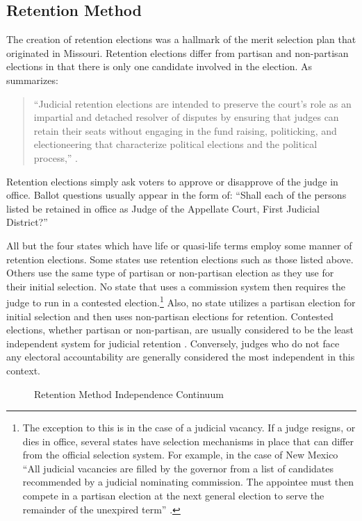 \documentclass[12pt]{article}
\begin{document}
\subsection*{Retention Method}
The creation of retention elections was a hallmark of the merit selection plan that originated in Missouri. Retention elections differ from partisan and non-partisan elections in that there is only one candidate involved in the election. As \citeauthor{Reid1999} summarizes: \begin{quote}``Judicial retention elections are intended to preserve the court’s role as an impartial and detached resolver of disputes by ensuring that judges can retain their seats without engaging in the fund raising, politicking, and electioneering that characterize political elections and the political process,'' \citep[68]{Reid1999}.\end{quote}  Retention elections simply ask voters to approve or disapprove of the judge in office. Ballot questions usually appear in the form of: ``Shall each of the persons listed be retained in office as Judge of the Appellate Court, First Judicial District?''

All but the four states which have life or quasi-life terms employ some manner of retention elections. Some states use retention elections such as those listed above. Others use the same type of partisan or non-partisan election as they use for their initial selection. No state that uses a commission system then requires the judge to run in a contested election.\footnote{The exception to this is in the case of a judicial vacancy.  If a judge resigns, or dies in office, several states have selection mechanisms in place that can differ from the official selection system.  For example, in the case of New Mexico ``All judicial vacancies are filled by the governor from a list of candidates recommended by a judicial nominating commission. The appointee must then compete in a partisan election at the next general election to serve the remainder of the unexpired term'' \citep{AJS}.}  Also, no state utilizes a partisan election for initial selection and then uses non-partisan elections for retention.  Contested elections, whether partisan or non-partisan, are usually considered to be the least independent system for judicial retention \citep{Choi2010,ABA2003,Canes-Wrone2012}. Conversely, judges who do not face any electoral accountability are generally considered the most independent in this context.

\begin{figure}[tbh]\centering\caption{Retention Method Independence Continuum}\label{retentioncontinuum}
\end{figure}
\end{document}
